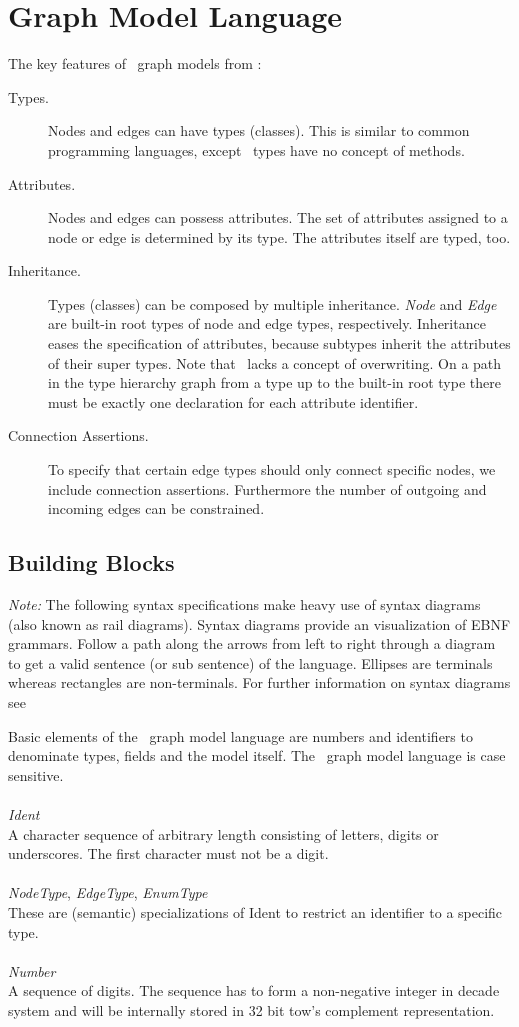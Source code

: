 \chapter{Graph Model Language}
The key features of \GrG\ graph models from \cite{geiss}:

\begin{description}
\item[Types.] Nodes and edges can have types (classes). This is similar to common programming languages, except \GrG\ types have no concept of methods. 
\item[Attributes.] Nodes and edges can possess attributes. The set of attributes assigned to a node or edge is determined by its type. The attributes itself are typed, too.
\item[Inheritance.] Types (classes) can be composed by multiple inheritance. \emph{Node} and \emph{Edge} are built-in root types of node and edge types, respectively. Inheritance eases the specification of attributes, because subtypes inherit the attributes of their super types. Note that \GrG\ lacks a concept of overwriting. On a path in the type hierarchy graph from a type up to the built-in root type there must be exactly one declaration for each attribute identifier.
\item[Connection Assertions.] To specify that certain edge types should only connect specific nodes, we include connection assertions. Furthermore the number of outgoing and incoming edges can be constrained.
\end{description}

\section{Building Blocks}

\emph{Note:} The following syntax specifications make heavy use of syntax diagrams (also known as rail diagrams). Syntax diagrams provide an visualization of EBNF grammars. Follow a path along the arrows from left to right through a diagram to get a valid sentence (or sub sentence) of the language. Ellipses are terminals whereas rectangles are non-terminals. For further information on syntax diagrams see \cite{XXX}

Basic elements of the \GrG\ graph model language are numbers and identifiers to denominate types, fields and the model itself. The \GrG\ graph model language is case sensitive.\\
\\
\emph{Ident}\\
A character sequence of arbitrary length consisting of letters, digits or underscores. The first character must not be a digit.\\
\\
\emph{NodeType}, \emph{EdgeType}, \emph{EnumType}\\
These are (semantic) specializations of Ident to restrict an identifier to a specific type.\\
\\
\emph{Number}\\
A sequence of digits. The sequence has to form a non-negative integer in decade system and will be internally stored in 32 bit tow's complement representation.

